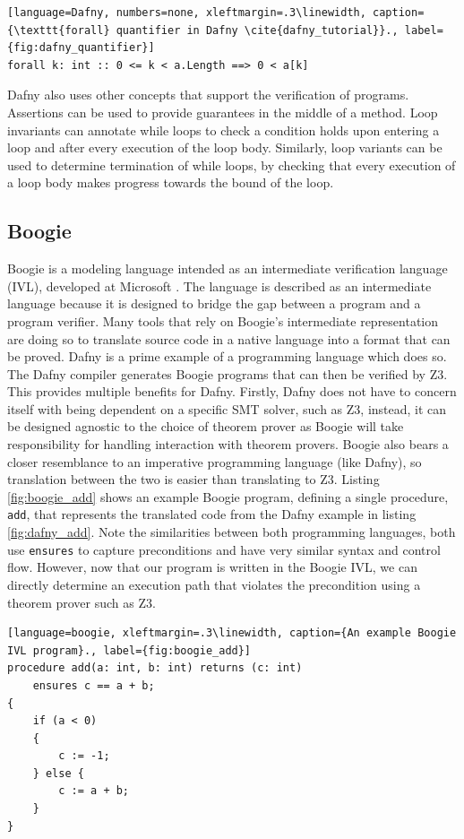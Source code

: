 \begin{lstlisting}[language=Dafny, numbers=none, xleftmargin=.3\linewidth, caption={\texttt{forall} quantifier in Dafny \cite{dafny_tutorial}}., label={fig:dafny_quantifier}]
forall k: int :: 0 <= k < a.Length ==> 0 < a[k]
\end{lstlisting}
\par
Dafny also uses other concepts that support the verification of programs. Assertions can be used to provide guarantees in the middle of a method. Loop invariants can annotate while loops to check a condition holds upon entering a loop and after every execution of the loop body. Similarly, loop variants can be used to determine termination of while loops, by checking that every execution of a loop body makes progress towards the bound of the loop.
\subsection{Boogie}
Boogie is a modeling language intended as an intermediate verification language (IVL), developed at Microsoft \cite{boogie}. The language is described as an intermediate language because it is designed to bridge the gap between a program and a program verifier. Many tools that rely on Boogie's intermediate representation are doing so to translate source code in a native language into a format that can be proved. Dafny is a prime example of a programming language which does so. The Dafny compiler generates Boogie programs that can then be verified by Z3. This provides multiple benefits for Dafny. Firstly, Dafny does not have to concern itself with being dependent on a specific SMT solver, such as Z3, instead, it can be designed agnostic to the choice of theorem prover as Boogie will take responsibility for handling interaction with theorem provers. Boogie also bears a closer resemblance to an imperative programming language (like Dafny), so translation between the two is easier than translating to Z3. Listing \ref{fig:boogie_add} shows an example Boogie program, defining a single procedure, \texttt{add}, that represents the translated code from the Dafny example in listing \ref{fig:dafny_add}. Note the similarities between both programming languages, both use \texttt{ensures} to capture preconditions and have very similar syntax and control flow. However, now that our program is written in the Boogie IVL, we can directly determine an execution path that violates the precondition using a theorem prover such as Z3.
\begin{lstlisting}[language=boogie, xleftmargin=.3\linewidth, caption={An example Boogie IVL program}., label={fig:boogie_add}]
procedure add(a: int, b: int) returns (c: int)
    ensures c == a + b;
{
    if (a < 0) 
    {
        c := -1;
    } else {
        c := a + b;
    }
}
\end{lstlisting}

